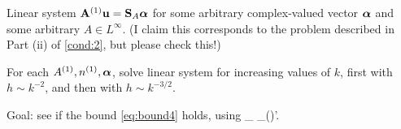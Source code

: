 \item Linear system $\mathbf{A}^{(1)} \mathbf{u} = \mathbf{S}_{A} {\boldsymbol{\alpha}}$ for some arbitrary complex-valued vector ${\boldsymbol{\alpha}}$ and some arbitrary $A\in L^\infty$. (I claim this corresponds to the problem described in Part (ii) of \cref{cond:2},  but please check this!)
\item For each ${A}^{(1)}, {n}^{(1)}, {\boldsymbol{\alpha}}$, solve linear system for increasing values of $k$, first with $h\sim k^{-2}$, and then with $h\sim k^{-3/2}$.
\item Goal: see if the bound \cref{eq:bound4} holds, using 
\beqs
{}_{\LtDR} \quad {} \quad {}_{(\HokDR)'}.
\eeqs
\eit
\een

